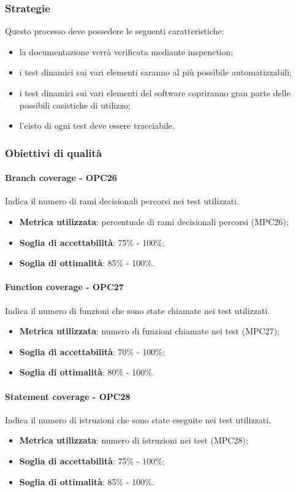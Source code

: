 \documentclass[PdQ.tex]{subfiles}
\begin{document}
		\subsubsection{Strategie}
			Questo processo deve possedere le seguenti caratteristiche:
			\begin{itemize}
				\item la documentazione verrà verificata mediante inspenction;
				\item i test dinamici sui vari elementi saranno al più possibile automatizzabili;
				\item i test dinamici sui vari elementi del software copriranno gran parte delle possibili casistiche di utilizzo;
				\item l'eisto di ogni test deve essere tracciabile.
			\end{itemize}
		
		\subsubsection{Obiettivi di qualità}
			\paragraph{Branch coverage - OPC26}
				Indica il numero di rami decisionali percorsi nei test utilizzati.
				\begin{itemize}
					\item \textbf{Metrica utilizzata}: percentuale di rami decisionali percorsi (MPC26);
					\item \textbf{Soglia di accettabilità}: 75\% - 100\%;
					\item \textbf{Soglia di ottimalità}: 85\% - 100\%.
				\end{itemize}
			
			\paragraph{Function coverage - OPC27}
				Indica il numero di funzioni che sono state chiamate nei test utilizzati.
				\begin{itemize}
					\item \textbf{Metrica utilizzata}: numero di funzioni chiamate nei test (MPC27);
					\item \textbf{Soglia di accettabilità}: 70\% - 100\%;
					\item \textbf{Soglia di ottimalità}: 80\% - 100\%.
				\end{itemize}
				
			\paragraph{Statement coverage - OPC28}
				Indica il numero di istruzioni che sono state eseguite nei test utilizzati.
				\begin{itemize}
					\item \textbf{Metrica utilizzata}: numero di istruzioni nei test (MPC28);
					\item \textbf{Soglia di accettabilità}: 75\% - 100\%;
					\item \textbf{Soglia di ottimalità}: 85\% - 100\%.
				\end{itemize}
\end{document}
